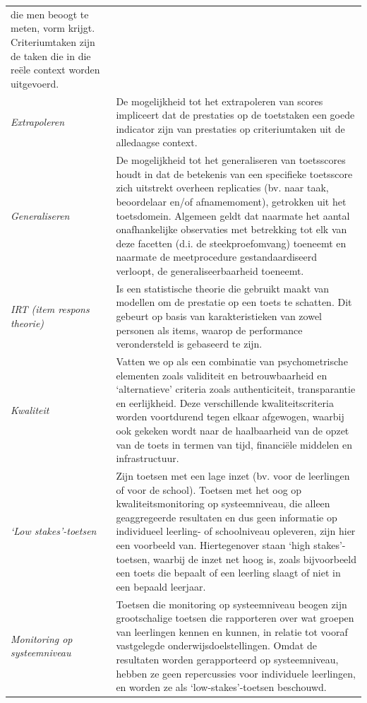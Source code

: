 \documentclass[
  letterpaper,
]{report}
\begin{document}
\begin{longtable}[]{@{}
  >{\raggedright\arraybackslash}p{}
  >{\raggedright\arraybackslash}p{}@{}}
die men beoogt te meten, vorm krijgt. Criteriumtaken zijn de taken die
in die reële context worden uitgevoerd. \\
\emph{Extrapoleren} & De mogelijkheid tot het extrapoleren van scores
impliceert dat de prestaties op de toetstaken een goede indicator zijn
van prestaties op criteriumtaken uit de alledaagse context. \\
\emph{Generaliseren} & De mogelijkheid tot het generaliseren van
toetsscores houdt in dat de betekenis van een specifieke toetsscore zich
uitstrekt overheen replicaties (bv. naar taak, beoordelaar en/of
afnamemoment), getrokken uit het toetsdomein. Algemeen geldt dat
naarmate het aantal onafhankelijke observaties met betrekking tot elk
van deze facetten (d.i. de steekproefomvang) toeneemt en naarmate de
meetprocedure gestandaardiseerd verloopt, de generaliseerbaarheid
toeneemt. \\
\emph{IRT (item respons theorie)} & Is een statistische theorie die
gebruikt maakt van modellen om de prestatie op een toets te schatten.
Dit gebeurt op basis van karakteristieken van zowel personen als items,
waarop de performance verondersteld is gebaseerd te zijn. \\
\emph{Kwaliteit} & Vatten we op als een combinatie van psychometrische
elementen zoals validiteit en betrouwbaarheid en `alternatieve' criteria
zoals authenticiteit, transparantie en eerlijkheid. Deze verschillende
kwaliteitscriteria worden voortdurend tegen elkaar afgewogen, waarbij
ook gekeken wordt naar de haalbaarheid van de opzet van de toets in
termen van tijd, financiële middelen en infrastructuur. \\
\emph{`Low stakes'-toetsen} & Zijn toetsen met een lage inzet (bv. voor
de leerlingen of voor de school). Toetsen met het oog op
kwaliteitsmonitoring op systeemniveau, die alleen geaggregeerde
resultaten en dus geen informatie op individueel leerling- of
schoolniveau opleveren, zijn hier een voorbeeld van. Hiertegenover staan
`high stakes'-toetsen, waarbij de inzet net hoog is, zoals bijvoorbeeld
een toets die bepaalt of een leerling slaagt of niet in een bepaald
leerjaar. \\
\emph{Monitoring op systeemniveau} & Toetsen die monitoring op
systeemniveau beogen zijn grootschalige toetsen die rapporteren over wat
groepen van leerlingen kennen en kunnen, in relatie tot vooraf
vastgelegde onderwijsdoelstellingen. Omdat de resultaten worden
gerapporteerd op systeemniveau, hebben ze geen repercussies voor
individuele leerlingen, en worden ze als `low-stakes'-toetsen
beschouwd. \\

\end{longtable}
\end{document}

